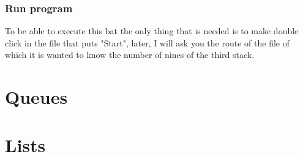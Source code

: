 \documentclass[a4paper]{article}
\theoremstyle{plain}
\theoremstyle{definition}
\begin{document}
        \subsubsection{Run program}
        To be able to execute this bat the only thing that is needed is to make double click in the file that puts "Start", later, I will ask you the route of the file of which it is wanted to know the number of nines of the third stack.
	
	
        
	\newpage
	\section{Queues}
	

	\section{Lists}

	

	

	
	
	
	
	
\end{document}
